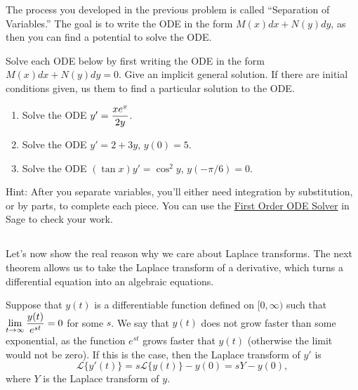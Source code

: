 The process you developed in the previous problem is called ``Separation of Variables.''  The goal is to write the ODE in the form $M(x)dx+N(y)dy$, as then you can find a potential to solve the ODE.







\begin{problem}
%
 Solve each ODE below by first writing the ODE in the form $M(x)dx+N(y)dy = 0$. Give an implicit general solution. If there are initial conditions given, us them to find a particular solution to the ODE. 
\begin{enumerate}
 \item Solve the ODE $y'=\displaystyle\frac{xe^x}{2y}$.
 \item Solve the ODE $y'=2+3y$, $y(0) = 5$. 
 \item Solve the ODE $(\tan x )y' = \cos^2 y$, $y(-\pi/6)=0$. 
\end{enumerate}
Hint: After you separate variables, you'll either need integration by substitution, or by parts, to complete each piece. You can use the \href{\urlfirstorderodesolver}{First Order ODE Solver} in Sage to check your work.
\end{problem}


\subsection*{\ideaD}

%
%
Let's now show the real reason why we care about Laplace transforms. The next theorem allows us to take the Laplace transform of a derivative, which turns a differential equation into an algebraic equations.  

\begin{theorem} \label{laplace transform of a derivative}
 Suppose that $y(t)$ is a differentiable function defined on $[0,\infty)$ such that $\displaystyle\lim_{t\to \infty}\frac{y(t)}{e^{st}}=0$ for some $s$. We say that $y(t)$ does not grow faster than some exponential, as the function $e^{st}$ grows faster that $y(t)$ (otherwise the limit would not be zero).  If this is the case, then the Laplace transform of $y'$ is
 $$\mathscr{L}\{y'(t)\} = s \mathscr{L}\{y(t)\} - y(0) = sY - y(0),$$
 where $Y$ is the Laplace transform of $y$. 
\end{theorem}

